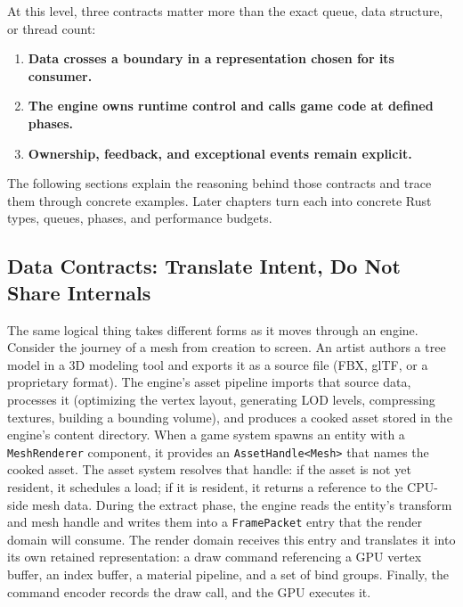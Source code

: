 \documentclass[
  11pt,
  letterpaper,
  DIV=11,
  numbers=noendperiod,
  twoside,
  open=right]{scrreprt}
\providecommand{\tightlist}{%
  \setlength{\itemsep}{0pt}\setlength{\parskip}{0pt}}
\begin{document}
At this level, three contracts matter more than the exact queue, data
structure, or thread count:

\begin{enumerate}
\def\labelenumi{\arabic{enumi}.}
\tightlist
\item
  \textbf{Data crosses a boundary in a representation chosen for its
  consumer.}
\item
  \textbf{The engine owns runtime control and calls game code at defined
  phases.}
\item
  \textbf{Ownership, feedback, and exceptional events remain explicit.}
\end{enumerate}

The following sections explain the reasoning behind those contracts and
trace them through concrete examples. Later chapters turn each into
concrete Rust types, queues, phases, and performance budgets.

\subsection{Data Contracts: Translate Intent, Do Not Share
Internals}\label{data-contracts-translate-intent-do-not-share-internals}

The same logical thing takes different forms as it moves through an
engine. Consider the journey of a mesh from creation to screen. An
artist authors a tree model in a 3D modeling tool and exports it as a
source file (FBX, glTF, or a proprietary format). The engine's asset
pipeline imports that source data, processes it (optimizing the vertex
layout, generating LOD levels, compressing textures, building a bounding
volume), and produces a cooked asset stored in the engine's content
directory. When a game system spawns an entity with a
\texttt{MeshRenderer} component, it provides an
\texttt{AssetHandle\textless{}Mesh\textgreater{}} that names the cooked
asset. The asset system resolves that handle: if the asset is not yet
resident, it schedules a load; if it is resident, it returns a reference
to the CPU-side mesh data. During the extract phase, the engine reads
the entity's transform and mesh handle and writes them into a
\texttt{FramePacket} entry that the render domain will consume. The
render domain receives this entry and translates it into its own
retained representation: a draw command referencing a GPU vertex buffer,
an index buffer, a material pipeline, and a set of bind groups. Finally,
the command encoder records the draw call, and the GPU executes it.
\end{document}
